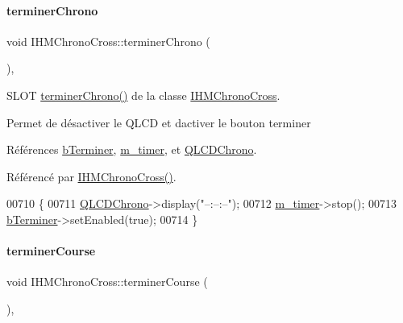 \paragraph{\texorpdfstring{terminer\+Chrono}{terminerChrono}}
{\footnotesize\ttfamily void I\+H\+M\+Chrono\+Cross\+::terminer\+Chrono (\begin{DoxyParamCaption}{ }\end{DoxyParamCaption})\hspace{0.3cm}{\ttfamily [private]}, {\ttfamily [slot]}}



S\+L\+OT \hyperlink{class_i_h_m_chrono_cross_a32ee157ca6bd8c3e94b57f3cecdeee4e}{terminer\+Chrono()} de la classe \hyperlink{class_i_h_m_chrono_cross}{I\+H\+M\+Chrono\+Cross}. 

Permet de désactiver le Q\+L\+CD et d\textquotesingle{}activer le bouton terminer 

Références \hyperlink{class_i_h_m_chrono_cross_a63721ec2d7d51b11b164b4502ace8262}{b\+Terminer}, \hyperlink{class_i_h_m_chrono_cross_ad29ebde513a6e722cf87aa06e767416a}{m\+\_\+timer}, et \hyperlink{class_i_h_m_chrono_cross_a6169c1483faab14d1f619d1d838c198e}{Q\+L\+C\+D\+Chrono}.



Référencé par \hyperlink{class_i_h_m_chrono_cross_a479fc90733fba3e65fb06aa4a3adc02e}{I\+H\+M\+Chrono\+Cross()}.


\begin{DoxyCode}
00710 \{
00711     \hyperlink{class_i_h_m_chrono_cross_a6169c1483faab14d1f619d1d838c198e}{QLCDChrono}->display(\textcolor{stringliteral}{"--:--:--"});
00712     \hyperlink{class_i_h_m_chrono_cross_ad29ebde513a6e722cf87aa06e767416a}{m\_timer}->stop();
00713     \hyperlink{class_i_h_m_chrono_cross_a63721ec2d7d51b11b164b4502ace8262}{bTerminer}->setEnabled(\textcolor{keyword}{true});
00714 \}
\end{DoxyCode}
\mbox{\label{class_i_h_m_chrono_cross_ac89c6ec3040e8b787f1fbdb670405023}} 
\paragraph{\texorpdfstring{terminer\+Course}{terminerCourse}}
{\footnotesize\ttfamily void I\+H\+M\+Chrono\+Cross\+::terminer\+Course (\begin{DoxyParamCaption}{ }\end{DoxyParamCaption})\hspace{0.3cm}{\ttfamily [private]}, {\ttfamily [slot]}}



